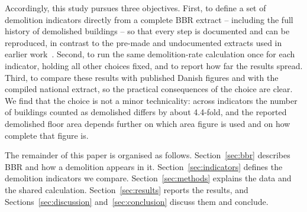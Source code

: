 Accordingly, this study pursues three objectives. First, to define a set of
demolition indicators directly from a complete BBR extract -- including the
full history of demolished buildings -- so that every step is documented and
can be reproduced, in contrast to the pre-made and undocumented extracts
used in earlier work~\cite{kurvinen2021modeling}. Second, to run the same
demolition-rate calculation once for each indicator, holding all other
choices fixed, and to report how far the results spread. Third, to compare
these results with published Danish figures and with the compiled national
extract, so the practical consequences of the choice are clear. We find that
the choice is not a minor technicality: across indicators the number of
buildings counted as demolished differs by about 4.4-fold, and the reported
demolished floor area depends further on which area figure is used and on
how complete that figure is.

The remainder of this paper is organised as follows.
Section~\ref{sec:bbr} describes BBR and how a demolition appears in it.
Section~\ref{sec:indicators} defines the demolition indicators we compare.
Section~\ref{sec:methods} explains the data and the shared calculation.
Section~\ref{sec:results} reports the results, and
Sections~\ref{sec:discussion} and~\ref{sec:conclusion} discuss them and
conclude.

